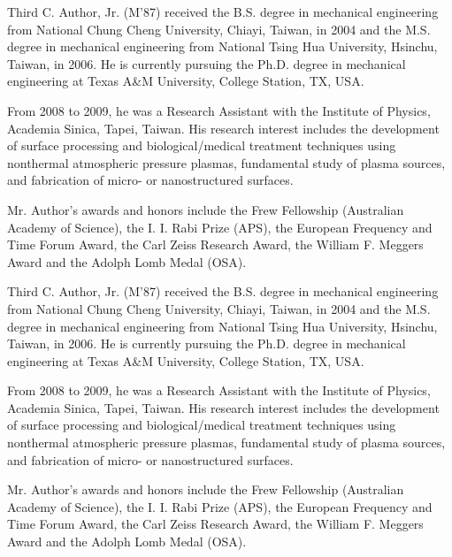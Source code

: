 \documentclass{ieeeaccess}
\begin{document}
\begin{IEEEbiography}{Third C. Author, Jr.} (M'87) received the B.S. degree in mechanical
engineering from National Chung Cheng University, Chiayi, Taiwan, in 2004
and the M.S. degree in mechanical engineering from National Tsing Hua
University, Hsinchu, Taiwan, in 2006. He is currently pursuing the Ph.D.
degree in mechanical engineering at Texas A{\&}M University, College
Station, TX, USA.

From 2008 to 2009, he was a Research Assistant with the Institute of
Physics, Academia Sinica, Tapei, Taiwan. His research interest includes the
development of surface processing and biological/medical treatment
techniques using nonthermal atmospheric pressure plasmas, fundamental study
of plasma sources, and fabrication of micro- or nanostructured surfaces.

Mr. Author's awards and honors include the Frew Fellowship (Australian
Academy of Science), the I. I. Rabi Prize (APS), the European Frequency and
Time Forum Award, the Carl Zeiss Research Award, the William F. Meggers
Award and the Adolph Lomb Medal (OSA).
\end{IEEEbiography}

\begin{IEEEbiography}{Third C. Author, Jr.} (M'87) received the B.S. degree in mechanical
engineering from National Chung Cheng University, Chiayi, Taiwan, in 2004
and the M.S. degree in mechanical engineering from National Tsing Hua
University, Hsinchu, Taiwan, in 2006. He is currently pursuing the Ph.D.
degree in mechanical engineering at Texas A{\&}M University, College
Station, TX, USA.

From 2008 to 2009, he was a Research Assistant with the Institute of
Physics, Academia Sinica, Tapei, Taiwan. His research interest includes the
development of surface processing and biological/medical treatment
techniques using nonthermal atmospheric pressure plasmas, fundamental study
of plasma sources, and fabrication of micro- or nanostructured surfaces.

Mr. Author's awards and honors include the Frew Fellowship (Australian
Academy of Science), the I. I. Rabi Prize (APS), the European Frequency and
Time Forum Award, the Carl Zeiss Research Award, the William F. Meggers
Award and the Adolph Lomb Medal (OSA).
\end{IEEEbiography}
\end{document}
